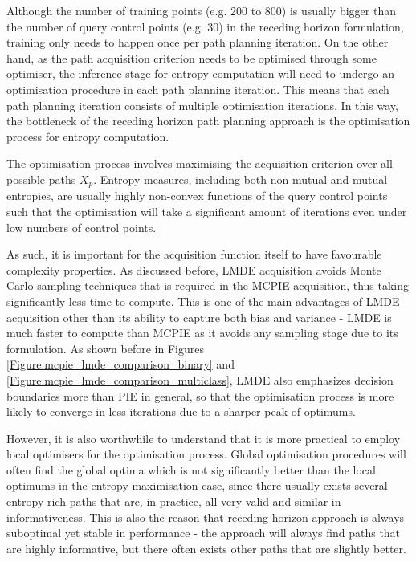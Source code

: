 			Although the number of training points (e.g. 200 to 800) is usually bigger than the number of query control points (e.g. 30) in the receding horizon formulation, training only needs to happen once per path planning iteration. On the other hand, as the path acquisition criterion needs to be optimised through some optimiser, the inference stage for entropy computation will need to undergo an optimisation procedure in each path planning iteration. This means that each path planning iteration consists of multiple optimisation iterations. In this way, the bottleneck of the receding horizon path planning approach is the optimisation process for entropy computation.
				
			The optimisation process involves maximising the acquisition criterion over all possible paths $X_{p}$. Entropy measures, including both non-mutual and mutual entropies, are usually highly non-convex functions of the query control points such that the optimisation will take a significant amount of iterations even under low numbers of control points.
			
			As such, it is important for the acquisition function itself to have favourable complexity properties. As discussed before, LMDE acquisition avoids Monte Carlo sampling techniques that is required in the MCPIE acquisition, thus taking significantly less time to compute. This is one of the main advantages of LMDE acquisition other than its ability to capture both bias and variance - LMDE is much faster to compute than MCPIE as it avoids any sampling stage due to its formulation. As shown before in Figures \ref{Figure:mcpie_lmde_comparison_binary} and \ref{Figure:mcpie_lmde_comparison_multiclass}, LMDE also emphasizes decision boundaries more than PIE in general, so that the optimisation process is more likely to converge in less iterations due to a sharper peak of optimums.
			
			However, it is also worthwhile to understand that it is more practical to employ local optimisers for the optimisation process. Global optimisation procedures will often find the global optima which is not significantly better than the local optimums in the entropy maximisation case, since there usually exists several entropy rich paths that are, in practice, all very valid and similar in informativeness. This is also the reason that receding horizon approach is always suboptimal yet stable in performance - the approach will always find paths that are highly informative, but there often exists other paths that are slightly better.
						
